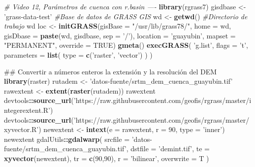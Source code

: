 \documentclass[11pt,]{article}
\newenvironment{Shaded}{\begin{snugshade}}{\end{snugshade}}
\newcommand{\KeywordTok}[1]{\textcolor[rgb]{0.13,0.29,0.53}{\textbf{#1}}}
\newcommand{\DataTypeTok}[1]{\textcolor[rgb]{0.13,0.29,0.53}{#1}}
\newcommand{\DecValTok}[1]{\textcolor[rgb]{0.00,0.00,0.81}{#1}}
\newcommand{\StringTok}[1]{\textcolor[rgb]{0.31,0.60,0.02}{#1}}
\newcommand{\CommentTok}[1]{\textcolor[rgb]{0.56,0.35,0.01}{\textit{#1}}}
\newcommand{\OtherTok}[1]{\textcolor[rgb]{0.56,0.35,0.01}{#1}}
\newcommand{\OperatorTok}[1]{\textcolor[rgb]{0.81,0.36,0.00}{\textbf{#1}}}
\newcommand{\NormalTok}[1]{#1}
\begin{document}
\begin{Shaded}
\begin{Highlighting}[]
{{{{{\CommentTok{# Video 12, Parámetros de cuenca con r.basin ----}
\KeywordTok{library}\NormalTok{(rgrass7)}
\NormalTok{gisdbase <-}\StringTok{ 'grass-data-test'} \CommentTok{#Base de datos de GRASS GIS}
\NormalTok{wd <-}\StringTok{ }\KeywordTok{getwd}\NormalTok{() }\CommentTok{#Directorio de trabajo}
\NormalTok{wd}
\NormalTok{loc <-}\StringTok{ }\KeywordTok{initGRASS}\NormalTok{(}\DataTypeTok{gisBase =} \StringTok{"/usr/lib/grass78/"}\NormalTok{,}
                 \DataTypeTok{home =}\NormalTok{ wd,}
                 \DataTypeTok{gisDbase =} \KeywordTok{paste}\NormalTok{(wd, gisdbase, }\DataTypeTok{sep =} \StringTok{'/'}\NormalTok{),}
                 \DataTypeTok{location =} \StringTok{'guayubin'}\NormalTok{,}
                 \DataTypeTok{mapset =} \StringTok{"PERMANENT"}\NormalTok{,}
                 \DataTypeTok{override =} \OtherTok{TRUE}\NormalTok{)}
\KeywordTok{gmeta}\NormalTok{()}
\KeywordTok{execGRASS}\NormalTok{(}
  \StringTok{'g.list'}\NormalTok{,}
  \DataTypeTok{flags =} \StringTok{'t'}\NormalTok{,}
  \DataTypeTok{parameters =} \KeywordTok{list}\NormalTok{(}
    \DataTypeTok{type =} \KeywordTok{c}\NormalTok{(}\StringTok{'raster'}\NormalTok{, }\StringTok{'vector'}\NormalTok{)}
\NormalTok{  )}
\NormalTok{)}

\NormalTok{## Convertir a números enteros la extensión y la resolución del DEM}
\KeywordTok{library}\NormalTok{(raster)}
\NormalTok{rutadem <-}\StringTok{ 'datos-fuente/srtm_dem_cuenca_guayubin.tif'}
\NormalTok{rawextent <-}\StringTok{ }\KeywordTok{extent}\NormalTok{(}\KeywordTok{raster}\NormalTok{(rutadem))}
\NormalTok{rawextent}
\NormalTok{devtools}\OperatorTok{::}\KeywordTok{source_url}\NormalTok{(}\StringTok{'https://raw.githubusercontent.com/geofis/rgrass/master/integerextent.R'}\NormalTok{)}
\NormalTok{devtools}\OperatorTok{::}\KeywordTok{source_url}\NormalTok{(}\StringTok{'https://raw.githubusercontent.com/geofis/rgrass/master/xyvector.R'}\NormalTok{)}
\NormalTok{newextent <-}\StringTok{ }\KeywordTok{intext}\NormalTok{(}\DataTypeTok{e =}\NormalTok{ rawextent, }\DataTypeTok{r =} \DecValTok{90}\NormalTok{, }\DataTypeTok{type =} \StringTok{'inner'}\NormalTok{)}
\NormalTok{newextent}
\NormalTok{gdalUtils}\OperatorTok{::}\KeywordTok{gdalwarp}\NormalTok{(}
  \DataTypeTok{srcfile =} \StringTok{'datos-fuente/srtm_dem_cuenca_guayubin.tif'}\NormalTok{,}
  \DataTypeTok{dstfile =} \StringTok{'demint.tif'}\NormalTok{,}
  \DataTypeTok{te =} \KeywordTok{xyvector}\NormalTok{(newextent),}
  \DataTypeTok{tr =} \KeywordTok{c}\NormalTok{(}\DecValTok{90}\NormalTok{,}\DecValTok{90}\NormalTok{),}
  \DataTypeTok{r =} \StringTok{'bilinear'}\NormalTok{,}
  \DataTypeTok{overwrite =}\NormalTok{ T}
\NormalTok{)}

}}}}}
\end{Highlighting}
\end{Shaded}
\end{document}
